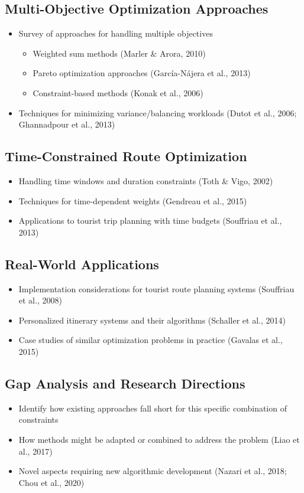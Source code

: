 \subsection{Multi-Objective Optimization Approaches}
\begin{itemize}
    \item Survey of approaches for handling multiple objectives
    \begin{itemize}
        \item Weighted sum methods (Marler \& Arora, 2010)
        \item Pareto optimization approaches (García-Nájera et al., 2013)
        \item Constraint-based methods (Konak et al., 2006)
    \end{itemize}
    \item Techniques for minimizing variance/balancing workloads (Dutot et al., 2006; Ghannadpour et al., 2013)
\end{itemize}

\subsection{Time-Constrained Route Optimization}
\begin{itemize}
    \item Handling time windows and duration constraints (Toth \& Vigo, 2002)
    \item Techniques for time-dependent weights (Gendreau et al., 2015)
    \item Applications to tourist trip planning with time budgets (Souffriau et al., 2013)
\end{itemize}

\subsection{Real-World Applications}
\begin{itemize}
    \item Implementation considerations for tourist route planning systems (Souffriau et al., 2008)
    \item Personalized itinerary systems and their algorithms (Schaller et al., 2014)
    \item Case studies of similar optimization problems in practice (Gavalas et al., 2015)
\end{itemize}

\subsection{Gap Analysis and Research Directions}
\begin{itemize}
    \item Identify how existing approaches fall short for this specific combination of constraints
    \item How methods might be adapted or combined to address the problem (Liao et al., 2017)
    \item Novel aspects requiring new algorithmic development (Nazari et al., 2018; Chou et al., 2020)
\end{itemize}


